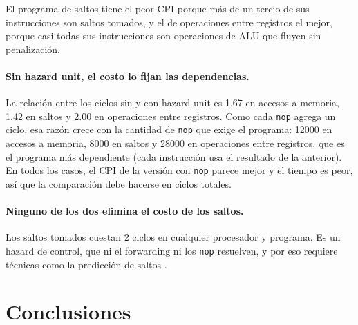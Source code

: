 \documentclass[11pt,a4paper]{article}
\begin{document}
El programa de saltos tiene el peor CPI porque m\'as de un tercio de sus
instrucciones son saltos tomados, y el de operaciones entre registros el mejor,
porque casi todas sus instrucciones son operaciones de ALU que fluyen sin
penalizaci\'on.

\paragraph{Sin hazard unit, el costo lo fijan las dependencias.}
La relaci\'on entre los ciclos sin y con hazard unit es 1.67 en accesos a
memoria, 1.42 en saltos y 2.00 en operaciones entre registros. Como cada
\texttt{nop} agrega un ciclo, esa raz\'on crece con la cantidad de \texttt{nop} que
exige el programa: 12000 en accesos a memoria, 8000 en saltos y 28000 en
operaciones entre registros, que es el programa m\'as dependiente (cada
instrucci\'on usa el resultado de la anterior). En todos los casos, el CPI de la
versi\'on con \texttt{nop} parece mejor y el tiempo es peor, as\'i que la
comparaci\'on debe hacerse en ciclos totales.

\paragraph{Ninguno de los dos elimina el costo de los saltos.}
Los saltos tomados cuestan 2 ciclos en cualquier procesador y programa. Es un
hazard de control, que ni el forwarding ni los \texttt{nop} resuelven, y por eso
requiere t\'ecnicas como la predicci\'on de saltos \cite{patterson,smith}.

\section{Conclusiones}
\end{document}
